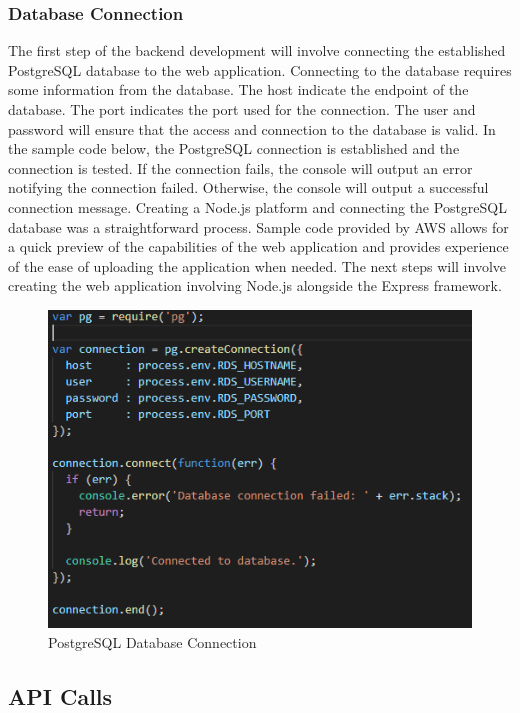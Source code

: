 \documentclass[12pt]{report}
\begin{document}
\subsubsection{Database Connection}

The first step of the backend development will involve connecting the established PostgreSQL database to the web application.  Connecting to the database requires some information from the database.  The host indicate the endpoint of the database.  The port indicates the port used for the connection.  The user and password will ensure that the access and connection to the database is valid.  In the sample code below, the PostgreSQL connection is established and the connection is tested.  If the connection fails, the console will output an error notifying the connection failed. Otherwise, the console will output a successful connection message.
Creating a Node.js platform and connecting the PostgreSQL database was a straightforward process.  Sample code provided by AWS allows for a quick preview of the capabilities of the web application and provides experience of the ease of uploading the application when needed.
The next steps will involve creating the web application involving Node.js alongside the Express framework.

\begin{figure}[h]
	\centering
	\includegraphics[scale=0.5]{database_connection}
	\caption{PostgreSQL Database Connection}
	\label{fig:javascripthttprequest}
\end{figure}

\subsection*{API Calls}
\end{document}
